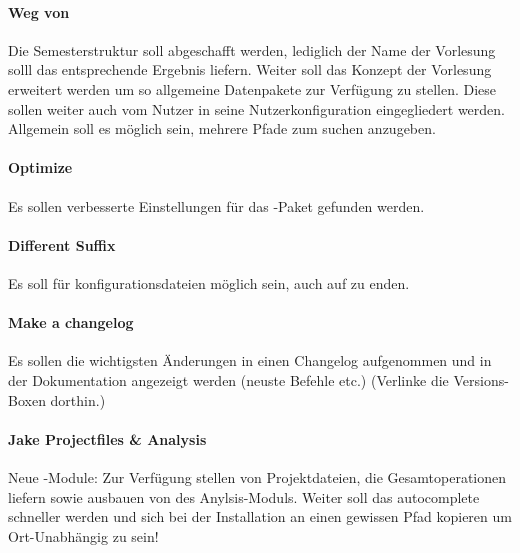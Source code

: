 \paragraph{Weg von }
Die Semesterstruktur soll abgeschafft werden, lediglich der Name der Vorlesung solll das entsprechende Ergebnis liefern. Weiter soll das Konzept der Vorlesung erweitert werden um so allgemeine Datenpakete zur Verfügung zu stellen. Diese sollen weiter auch vom Nutzer in seine Nutzerkonfiguration eingegliedert werden. Allgemein soll es möglich sein, mehrere Pfade zum suchen anzugeben.

\paragraph{Optimize }
Es sollen verbesserte Einstellungen für das -Paket gefunden werden.

\paragraph{Different Suffix}
Es soll für konfigurationsdateien möglich sein, auch auf  zu enden.

\paragraph{Make a changelog}
Es sollen die wichtigsten Änderungen in einen Changelog aufgenommen und in der Dokumentation angezeigt werden (neuste Befehle etc.) (Verlinke die Versions-Boxen dorthin.)

\paragraph{Jake Projectfiles \& Analysis}
Neue \Jake-Module: Zur Verfügung stellen von Projektdateien, die Gesamtoperationen liefern sowie ausbauen von des Anylsis-Moduls. Weiter soll das autocomplete schneller werden und sich \Jake bei der Installation an einen gewissen Pfad kopieren um Ort-Unabhängig zu sein!

